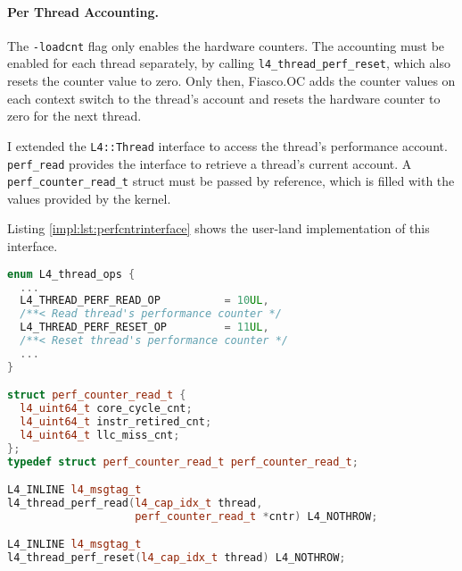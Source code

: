 \paragraph{Per Thread Accounting.}
The \texttt{-loadcnt} flag only enables the hardware counters.
The accounting must be enabled for each thread separately, by calling
\texttt{l4\_thread\_perf\_reset}, which also resets the counter value to zero.
Only then, Fiasco.OC adds the counter values on each context switch to the
thread's account and resets the hardware counter to zero for the next thread.

I extended the \texttt{L4::Thread} interface to access the thread's performance
account.
\texttt{perf\_read} provides the interface to retrieve a thread's current
account.
A \texttt{perf\_counter\_read\_t} struct must be passed by reference, which
is filled with the values provided by the kernel.

Listing \ref{impl:lst:perfcntrinterface} shows the user-land implementation of
this interface.

\begin{lstlisting}[language=c++,
  caption={User land interface for retrieving and resetting a thread's
    performance counters; UTCB-pointer left out for brevity.},
  label={impl:lst:perfcntrinterface}]
enum L4_thread_ops {
  ...
  L4_THREAD_PERF_READ_OP	      = 10UL,
  /**< Read thread's performance counter */
  L4_THREAD_PERF_RESET_OP	      =	11UL,
  /**< Reset thread's performance counter */
  ...
}

struct perf_counter_read_t {
  l4_uint64_t core_cycle_cnt;
  l4_uint64_t instr_retired_cnt;
  l4_uint64_t llc_miss_cnt;
};
typedef struct perf_counter_read_t perf_counter_read_t;

L4_INLINE l4_msgtag_t
l4_thread_perf_read(l4_cap_idx_t thread,
                    perf_counter_read_t *cntr) L4_NOTHROW;

L4_INLINE l4_msgtag_t
l4_thread_perf_reset(l4_cap_idx_t thread) L4_NOTHROW;
\end{lstlisting}
